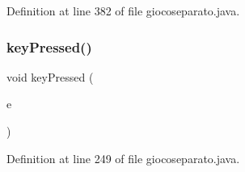 Definition at line 382 of file giocoseparato.\+java.

\mbox{\label{classcargame_1_1giocoseparato_aa12eb1084be2c4d9b03d5f248f00900d}} 
\subsubsection{\texorpdfstring{key\+Pressed()}{keyPressed()}}
{\footnotesize\ttfamily void key\+Pressed (\begin{DoxyParamCaption}\item[{Key\+Event}]{e }\end{DoxyParamCaption})}



Definition at line 249 of file giocoseparato.\+java.


